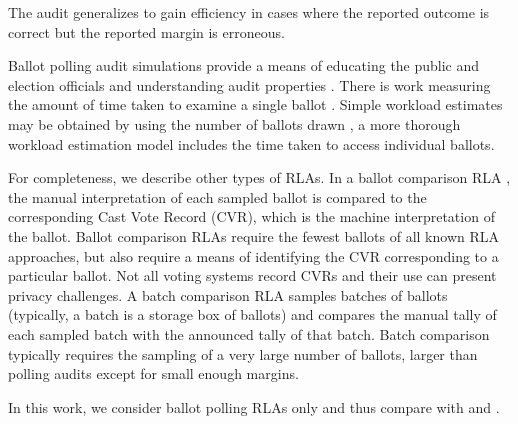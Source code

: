 The \ALPHA audit \cite{alpha} generalizes \BRAVO to gain efficiency in cases where the reported outcome is correct but the reported margin is erroneous.

Ballot polling audit simulations provide a means of educating the public and election officials \cite{dice} and understanding audit properties \cite{mclaughlin_thesis,simulations_house, blom_IRV, DBLP:conf/evoteid/HuangRSTV20}. There is work measuring the amount of time taken to examine a single ballot \cite{RI-report}. 
Simple workload estimates may be obtained by using the number of ballots drawn \cite{bernoulli-ballot-polling}, a more thorough workload estimation model includes the time taken to access individual ballots\cite{bernhard-diss}. 

For completeness, we describe other types of RLAs. In a ballot comparison RLA \cite{RLA}, the manual interpretation of each sampled ballot is compared to the corresponding Cast Vote Record (CVR), which is the machine interpretation of the ballot. Ballot comparison RLAs require the fewest ballots of all known RLA approaches, but also require a means of identifying the CVR corresponding to a particular ballot. Not all voting systems record CVRs and their use can present privacy challenges. %
A batch comparison RLA \cite{RI-report} samples batches of ballots (typically, a batch is a storage box of ballots) and compares the manual tally of each sampled batch with the announced tally of that batch. %
Batch comparison typically requires the sampling of a very large number of ballots, larger than polling audits except for small enough margins. 

In this work, we consider ballot polling RLAs only and thus compare \Providence with \BRAVO and \Minerva.
